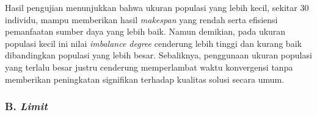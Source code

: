 Hasil pengujian menunjukkan bahwa ukuran populasi yang lebih kecil, sekitar 30 individu, mampu memberikan hasil \textit{makespan} yang rendah serta efisiensi pemanfaatan sumber daya yang lebih baik. Namun demikian, pada ukuran populasi kecil ini nilai \textit{imbalance degree} cenderung lebih tinggi dan kurang baik dibandingkan populasi yang lebih besar. Sebaliknya, penggunaan ukuran populasi yang terlalu besar justru cenderung memperlambat waktu konvergensi tanpa memberikan peningkatan signifikan terhadap kualitas solusi secara umum.

\newpage

\subsubsection{B. \textit{Limit}}

